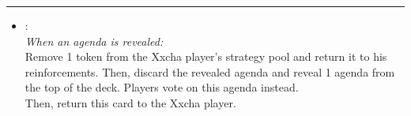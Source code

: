 \begin{multicols}{2}
\vspace{-10pt}\rule{\hsize}{0.4pt}\vspace{5pt}


\begin{itemize}
\item {}:\\
\emph{When an agenda is revealed:}\\
Remove 1 token from the Xxcha player's strategy pool and return it to his reinforcements. Then, discard the revealed agenda and reveal 1 agenda from the top of the deck. Players vote on this agenda instead.\\
Then, return this card to the Xxcha player.
\end{itemize}

\end{multicols}




